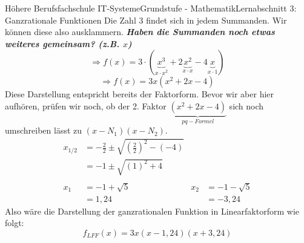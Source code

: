 \documentclass[11pt,twocolumn,oneside,openany,headings=optiontotoc,11pt,numbers=noenddot]{article}
\begin{document}
\begin{worksheet}{Höhere Berufsfachschule IT-Systeme}{Grundstufe - Mathematik}{Lernabschnitt 3: Ganzrationale Funktionen}
		Die Zahl \(3\) findet sich in jedem Summanden. Wir können diese also ausklammern. \textit{\textbf{\textit{Haben die Summanden noch etwas weiteres gemeinsam? (z.B. \(x\))}}}
		\[\Rightarrow f(x) = 3\cdot{}(\underbrace{x^3}_{x\cdot{}x^2} +2\underbrace{x^2}_{x\cdot{}x} -4\underbrace{x}_{x\cdot{}1})\]
		\[\Rightarrow f(x) = 3x(x^2 +2x -4)\]
		Diese Darstellung entspricht bereits der Faktorform. Bevor wir aber hier aufhören, prüfen wir noch, ob der 2. Faktor \(\underbrace{(x^2+2x-4)}_{pq-Formel}\) sich noch umschreiben lässt zu \((x-N_1)(x-N_2)\).\\
		\begin{align*}
			x_{1/2} & = -\frac{2}{2} \pm \sqrt{\left(\frac{2}{2}\right)^2 - (-4)}\\
			& = -1 \pm \sqrt{(1)^2 + 4}\\
			\\
			x_1 & = -1 + \sqrt{5} & x_2 & = -1 - \sqrt{5}\\
			& = 1,24 & & = -3,24
		\end{align*}
		Also wäre die Darstellung der ganzrationalen Funktion in Linearfaktorform wie folgt: \[f_{LFF}(x) = 3x(x-1,24)(x+3,24)\]
	\end{worksheet}
\end{document}
